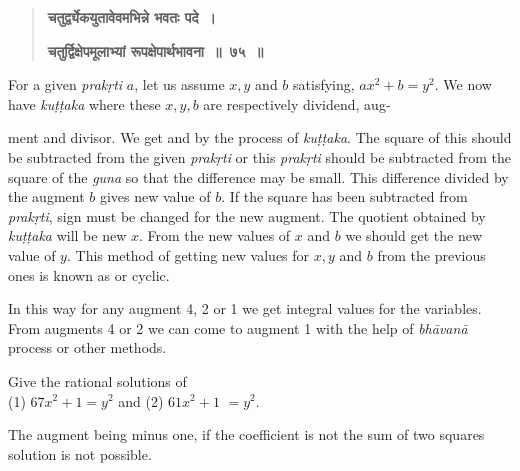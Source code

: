 \documentclass[]{article}
\begin{document}
{\begin{quote}
{{\textbf{{\color{purple}चतुर्द्व्येकयुतावेवमभिन्ने भवतः पदे~। }}

\textbf{{\color{purple}चतुर्द्विक्षेपमूलाभ्यां रूपक्षेपार्थभावना~॥~७५~॥} }}
}  \end{quote}

For a given \textit{prakṛti} $a$, let us assume $x, y$ and $b$ satisfying, $ax^{2} + b =y^{2}$. We now have \textit{kuṭṭaka} where these $x, y, b$ are respectively dividend, aug-
\newpage
\large

\noindent ment and divisor. We get {} and {} by the process of \textit{kuṭṭaka}. The square of this {} should be subtracted from the given \textit{prakṛti} or this \textit{prakṛti} should be subtracted from the square of the \textit{guna} so that the difference may be small. This difference divided by the augment $b$ gives new value of $b$. If the square has been subtracted from \textit{prakṛti}, sign must be changed for the new augment. The quotient obtained by \textit{kuṭṭaka} will be new $x$. From the new values of $x$ and $b$ we should get the new value of $y$. This method of getting new values for $x, y$ and $b$ from the previous ones is known as {} or cyclic.

In this way for any augment 4, 2 or 1 we get integral values for the variables. From augments 4 or 2 we can come to augment 1 with the help of \textit{bhāvanā} process or other methods.

\begin{quote}  {
}  \end{quote}
\vspace{-2mm}

{Give the rational solutions of\\
\indent (1) $67 x^{2} + 1 = y^{2}$ and (2) $61x^{2} + 1$ $= y^{2}$}.

\begin{quote}  {
}  \end{quote}

{The augment being minus one, if the coefficient is not the sum of two
squares solution is not possible.}

}
\end{document}
